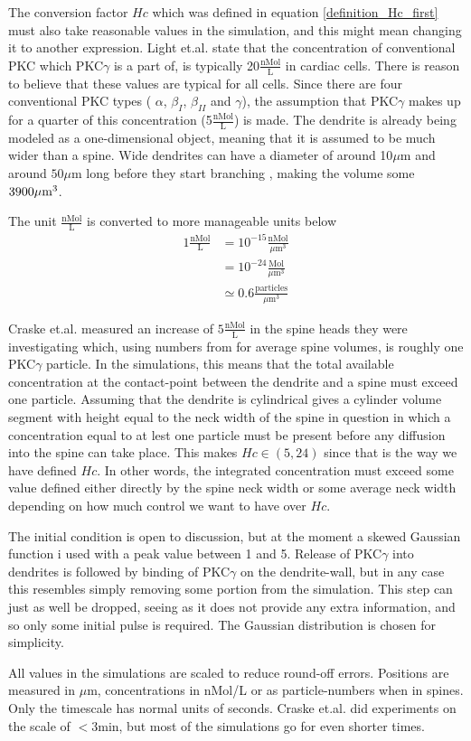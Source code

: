 The conversion factor $Hc$ which was defined in equation \eqref{definition_Hc_first} must also take reasonable values in the simulation, and this might mean changing it to another expression. 
Light et.al. \cite{light1996protein} state that the concentration of conventional PKC which PKC$\gamma$ is a part of, is typically 20$\frac{\text{nMol}}{\text{L}}$ in cardiac cells. 
There is reason to believe that these values are typical for all cells. 
Since there are four conventional PKC types ( $\alpha$, $\beta_{I}$, $\beta_{II}$ and $\gamma$), the assumption that PKC$\gamma$ makes up for a quarter of this concentration (5$\frac{\text{nMol}}{\text{L}}$) is made. 
The dendrite is already being modeled as a one-dimensional object, meaning that it is assumed to be much wider than a spine. 
Wide dendrites can have a diameter of around 10$\mu$m and around $50\mu$m long before they start branching \cite{wikipedia??}, making the volume some $3900\mu\text m^3$. 

The unit $\frac{\text{nMol}}{\text{L}}$ is converted to more manageable units below 
\begin{align*}
 1\frac{\text{nMol}}{\text{L}} &= 10^{-15}\frac{\text{nMol}}{\mu\text{m}^3}\\
 &= 10^{-24}\frac{\text{Mol}}{\mu\text{m}^3}\\
 &\simeq 0.6\frac{\text{particles}}{\mu\text{m}^3}
\end{align*}

Craske et.al. measured an increase of $5\frac{\text{nMol}}{\text{L}}$ in the spine heads they were investigating \cite{craske2005spines} which, using numbers from \cite{arellano2007ultrastructure} for average spine volumes, is roughly one PKC$\gamma$ particle. 
In the simulations, this means that the total available concentration at the contact-point between the dendrite and a spine must exceed one particle. 
Assuming that the dendrite is cylindrical gives a cylinder volume segment with height equal to the neck width of the spine in question in which a concentration equal to at lest one particle must be present before any diffusion into the spine can take place. 
This makes $Hc \in (5,24)$ since that is the way we have defined $Hc$. 
In other words, the integrated concentration must exceed some value defined either directly by the spine neck width or some average neck width depending on how much control we want to have over $Hc$.

The initial condition is open to discussion, but at the moment a skewed Gaussian function i used with a peak value between 1 and 5. 
Release of PKC$\gamma$ into dendrites is followed by binding of PKC$\gamma$ on the dendrite-wall, but in any case this resembles simply removing some portion from the simulation. 
This step can just as well be dropped, seeing as it does not provide any extra information, and so only some initial pulse is required. 
The Gaussian distribution is chosen for simplicity. 

All values in the simulations are scaled to reduce round-off errors. 
Positions are measured in $\mu$m, concentrations in nMol/L or as particle-numbers when in spines. Only the timescale has normal units of seconds. 
Craske et.al. did experiments on the scale of $<3$min, but most of the simulations go for even shorter times.